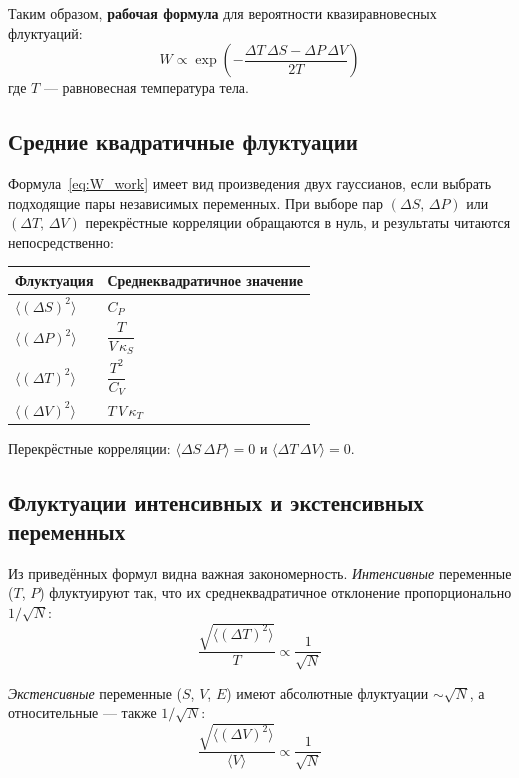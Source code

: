 \documentclass[../general/general]{subfiles}
\begin{document}
Таким образом, \textbf{рабочая формула} для вероятности квазиравновесных флуктуаций:
\begin{equation}
    \boxed{W \propto \exp\!\left(-\frac{\Delta T\,\Delta S - \Delta P\,\Delta V}{2T}\right)}
    \label{eq:W_work}
\end{equation}
где $T$ --- равновесная температура тела.

\subsection{Средние квадратичные флуктуации}

Формула~\eqref{eq:W_work} имеет вид произведения двух гауссианов, если выбрать подходящие пары независимых переменных. При выборе пар $(\Delta S,\,\Delta P)$ или $(\Delta T,\,\Delta V)$ перекрёстные корреляции обращаются в нуль, и результаты читаются непосредственно:

\begin{center}
\renewcommand{\arraystretch}{1.5}
\begin{tabular}{ll}
\hline
Флуктуация & Среднеквадратичное значение \\
\hline
$\langle(\Delta S)^2\rangle$ & $C_P$ \\[2pt]
$\langle(\Delta P)^2\rangle$ & $\dfrac{T}{V\,\kappa_S}$ \\[8pt]
$\langle(\Delta T)^2\rangle$ & $\dfrac{T^2}{C_V}$ \\[8pt]
$\langle(\Delta V)^2\rangle$ & $T\,V\,\kappa_T$ \\
\hline
\end{tabular}
\end{center}

Перекрёстные корреляции: $\langle\Delta S\,\Delta P\rangle = 0$ и $\langle\Delta T\,\Delta V\rangle = 0$.

\subsection{Флуктуации интенсивных и экстенсивных переменных}

Из приведённых формул видна важная закономерность. \emph{Интенсивные} переменные ($T$, $P$) флуктуируют так, что их среднеквадратичное отклонение пропорционально $1/\sqrt{N}$:
\begin{equation}
    \frac{\sqrt{\langle(\Delta T)^2\rangle}}{T} \propto \frac{1}{\sqrt{N}}
\end{equation}

\emph{Экстенсивные} переменные ($S$, $V$, $E$) имеют абсолютные флуктуации $\sim\sqrt{N}$, а относительные --- также $1/\sqrt{N}$:
\begin{equation}
    \frac{\sqrt{\langle(\Delta V)^2\rangle}}{\langle V\rangle} \propto \frac{1}{\sqrt{N}}
\end{equation}
\end{document}
